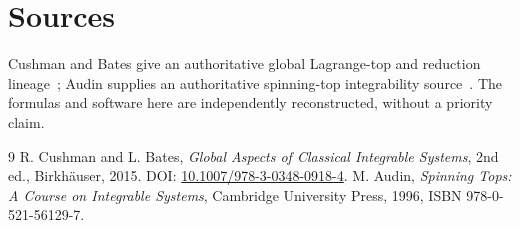 \documentclass[10pt]{article}
\begin{document}
\section{Sources}
Cushman and Bates give an authoritative global Lagrange-top and reduction
lineage~\cite{CB}; Audin supplies an authoritative spinning-top integrability
source~\cite{Audin}.  The formulas and software here are independently
reconstructed, without a priority claim.
\begin{thebibliography}{9}
\small
{} R. Cushman and L. Bates,
\emph{Global Aspects of Classical Integrable Systems}, 2nd ed.,
Birkh\"auser, 2015. DOI: \href{https://doi.org/10.1007/978-3-0348-0918-4}
{10.1007/978-3-0348-0918-4}.
 M. Audin, \emph{Spinning Tops: A Course on Integrable
Systems}, Cambridge University Press, 1996, ISBN 978-0-521-56129-7.
\end{thebibliography}
\fi
\end{document}
